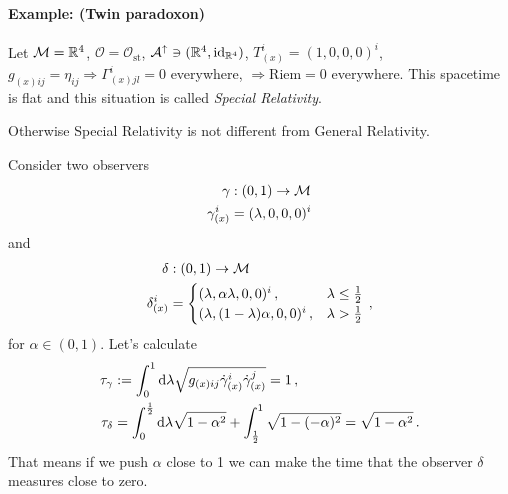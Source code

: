\paragraph{Example: (Twin paradoxon)}
Let $\mathcal{M} = \mathbb{R}^4$, $\mathcal{O} = \mathcal{O}_\text{st}$, 
$\mathcal{A}^\uparrow \ni (\mathbb{R}^4, \mathrm{id}_{\mathbb{R}^4})$, $T^i_{(x)} = (1,0,0,0)^i$,
$g_{(x)ij} = \eta_{ij} \Rightarrow \Gamma^i_{(x)jl}=0$ everywhere,
$\Rightarrow \mathrm{Riem}=0$ everywhere.
This spacetime is flat and this situation is called \textit{Special Relativity}.
\begin{note}
    Otherwise Special Relativity is not different from General Relativity.
\end{note}
Consider two observers
\begin{align}
    \gamma&: (0,1)\to \mathcal{M}\\
    \gamma_{(x)}^i &= (\lambda, 0,0,0)^i
\end{align}
and
\begin{align}
    \delta&:(0,1)\to\mathcal{M}\\
    \delta_{(x)}^i &=
    \begin{cases}
        (\lambda, \alpha \lambda, 0,0)^i\,,& \lambda \leq \frac{1}{2}\\
        (\lambda, (1-\lambda) \alpha , 0,0)^i\,,& \lambda > \frac{1}{2}\\
    \end{cases}\,,
\end{align}
for $\alpha\in(0,1)$.
Let's calculate
\begin{align}
    \tau_\gamma &:= \int_0^1 \operatorname{d\!} \lambda \sqrt{g_{(x)ij}\dot{\gamma}^i_{(x)}\dot{\gamma}^j_{(x)}} = 1\,,\\
    \tau_\delta &= \int_0^{\frac{1}{2}}\operatorname{d\!} \lambda \sqrt{1 - \alpha^2} + \int_{\frac{1}{2}}^1 \sqrt{1 - (-\alpha)^2}
    = \sqrt{1 - \alpha^2}\,.
\end{align}
That means if we push $\alpha$ close to 1 we can make the time that the observer
$\delta$ measures close to zero.

